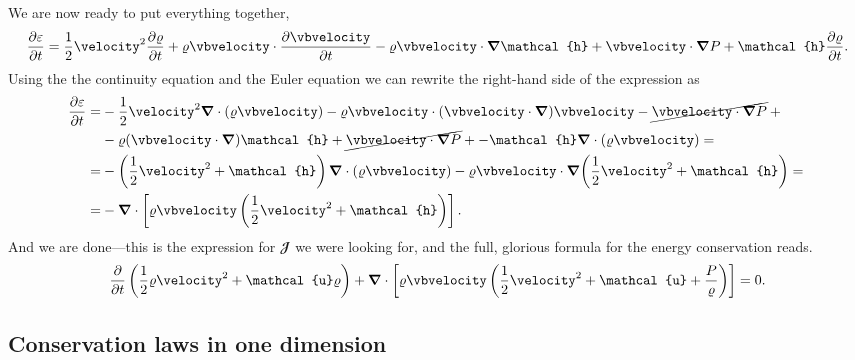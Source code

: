 We are now ready to put everything together,
\begin{align*}
  \pdv{\varepsilon}{t} =
  \frac{1}{2} \velocity^2 \pdv{\density}{t} + \density \vbvelocity \cdot \pdv{\vbvelocity}{t}
  -\density\vbvelocity \cdot \grad{\mathcal{h}} + \vbvelocity \cdot \grad{\pressure} +
  \mathcal{h} \pdv{\density}{t}.
\end{align*}
Using the the continuity equation and the Euler equation we can rewrite the right-hand
side of the expression as
\begin{align*}
  \pdv{\varepsilon}{t} = &
  -\frac{1}{2}\velocity^2 \vnabla \cdot (\density \vbvelocity)
  - \density \vbvelocity \cdot (\vbvelocity \cdot \grad) \vbvelocity
  - \cancel{\vbvelocity \cdot \grad{\pressure}} + \mathcal{}\\
  & -\density(\vbvelocity \cdot \grad) \mathcal{h}
  + \cancel{\vbvelocity \cdot \grad{\pressure}} +
  - \mathcal{h} \vnabla \cdot (\density \vbvelocity) = \mathcal{}\\
  = & - \left( \frac{1}{2} \velocity^2 + \mathcal{h} \right) \vnabla \cdot (\density \vbvelocity)
  - \density \vbvelocity \cdot \grad(\frac{1}{2} \velocity^2 + \mathcal{h}) = \mathcal{}\\
  = & - \vnabla \cdot \left[
    \density \vbvelocity \left( \frac{1}{2} \velocity^2 + \mathcal{h} \right)
    \right]\mathcal{}.
\end{align*}
And we are done---this is the expression for $\mathbfcal{J}$ we were looking for,
and the full, glorious formula for the energy conservation reads.
\begin{align}\label{eq:nrf_energy_conservation}
  \pdv{t} \left( \frac{1}{2}\density \velocity^2 + \mathcal{u} \density \right) +
  \vnabla \cdot \left[ \density \vbvelocity
  \left( \frac{1}{2} \velocity^2 + \mathcal{u} + \frac{\pressure}{\density} \right)\right] = 0.
\end{align}



\subsection{Conservation laws in one dimension}

